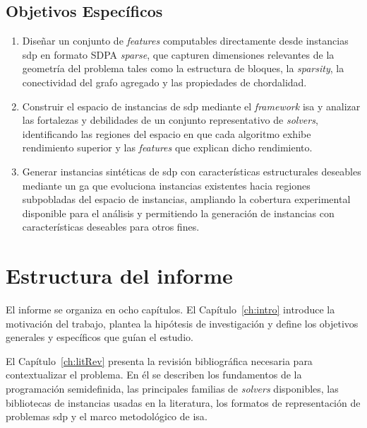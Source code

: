 \subsection{Objetivos Específicos}%

\begin{enumerate}
    \item Diseñar un conjunto de \textit{features} computables directamente desde instancias
    \acrshort{sdp} en formato SDPA \textit{sparse}, que capturen dimensiones relevantes
    de la geometría del problema tales como la estructura de bloques, la \textit{sparsity}, la conectividad del grafo
    agregado y las propiedades de chordalidad.

    \item Construir el espacio de instancias de \acrshort{sdp} mediante el \textit{framework} \acrshort{isa} y
    analizar las fortalezas y debilidades de un conjunto representativo de \textit{solvers}, identificando las regiones
    del espacio en que cada algoritmo exhibe rendimiento superior y las \textit{features} que explican
    dicho rendimiento.

    \item Generar instancias sintéticas de \acrshort{sdp} con características estructurales deseables mediante
    un \acrfull{ga} que evoluciona instancias existentes hacia regiones subpobladas del espacio de instancias,
    ampliando la cobertura experimental disponible para el análisis y permitiendo la generación de instancias
    con características deseables para otros fines.
\end{enumerate}

\section{Estructura del informe}

El informe se organiza en ocho capítulos.
El Capítulo~\ref{ch:intro} introduce la motivación del trabajo, plantea la hipótesis
de investigación y define los objetivos generales y específicos que guían el estudio.

El Capítulo~\ref{ch:litRev} presenta la revisión bibliográfica necesaria para
contextualizar el problema.
En él se describen los fundamentos de la programación semidefinida, las principales
familias de \textit{solvers} disponibles, las bibliotecas de instancias usadas en la literatura,
los formatos de representación de problemas \acrshort{sdp} y el marco metodológico de
\acrshort{isa}.

